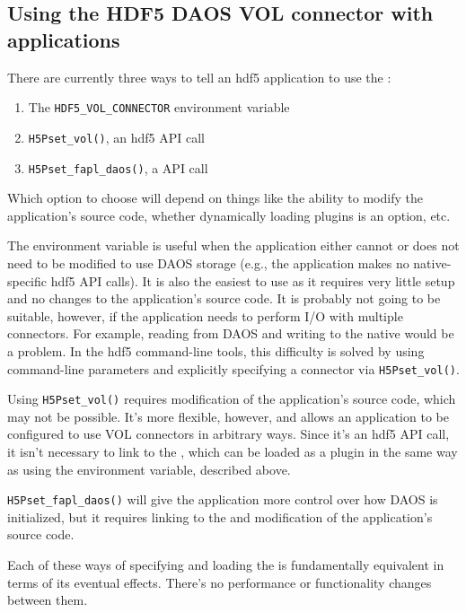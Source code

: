 \documentclass[../users_guide.tex]{subfiles}
\begin{document}
\subsection{Using the HDF5 DAOS VOL connector with applications}

There are currently three ways to tell an \acrshort{hdf5} application to use
the \dvc{}: 

\begin{enumerate}
    \item The \texttt{HDF5\_VOL\_CONNECTOR} environment variable
    \item \texttt{H5Pset\_vol()}, an \acrshort{hdf5} API call
    \item \texttt{H5Pset\_fapl\_daos()}, a \dvc{} API call
\end{enumerate}

Which option to choose will depend on things like the ability to modify the
application's source code, whether dynamically loading plugins is an option,
etc.

The environment variable is useful when the application either cannot or
does not need to be modified to use DAOS storage (e.g., the application makes
no native-specific \acrshort{hdf5} API calls). It is also the easiest to use
as it requires very little setup and no changes to the application's source
code. It is probably not going to be suitable, however, if the application
needs to perform I/O with multiple connectors. For example, reading from DAOS
and writing to the native \vc{} would be a problem. In the \acrshort{hdf5}
command-line tools, this difficulty is solved by using command-line parameters
and explicitly specifying a connector via \texttt{H5Pset\_vol()}.

Using \texttt{H5Pset\_vol()} requires modification of the application's
source code, which may not be possible. It's more flexible,
however, and allows an application to be configured to use VOL connectors in
arbitrary ways. Since it's an \acrshort{hdf5} API call, it isn't necessary to
link to the \dvc{}, which can be loaded as a plugin in the same way as using
the environment variable, described above.

\texttt{H5Pset\_fapl\_daos()} will give the application more control over how
DAOS is initialized, but it requires linking to the \dvc{} and modification of
the application's source code.

Each of these ways of specifying and loading the \dvc{} is fundamentally
equivalent in terms of its eventual effects. There's no performance or
functionality changes between them.
\end{document}
